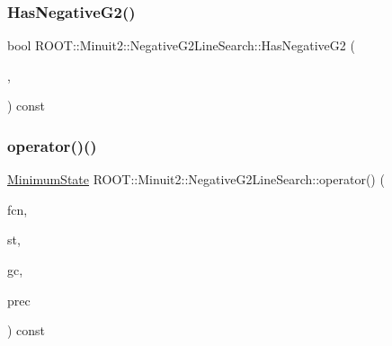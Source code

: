\mbox{\label{classROOT_1_1Minuit2_1_1NegativeG2LineSearch_a5450b0e5a0144e9c3e6028e8ae4a2c76}} 
\subsubsection{\texorpdfstring{HasNegativeG2()}{HasNegativeG2()}\hspace{0.1cm}{\footnotesize\ttfamily [3/3]}}
{\footnotesize\ttfamily bool R\+O\+O\+T\+::\+Minuit2\+::\+Negative\+G2\+Line\+Search\+::\+Has\+Negative\+G2 (\begin{DoxyParamCaption}\item[{const \mbox{\hyperlink{classROOT_1_1Minuit2_1_1FunctionGradient}{Function\+Gradient}} \&}]{,  }\item[{const \mbox{\hyperlink{classROOT_1_1Minuit2_1_1MnMachinePrecision}{Mn\+Machine\+Precision}} \&}]{ }\end{DoxyParamCaption}) const}

\mbox{\label{classROOT_1_1Minuit2_1_1NegativeG2LineSearch_ac39ff4c0d14335bd8c8bdcede066ecdf}} 
\subsubsection{\texorpdfstring{operator()()}{operator()()}\hspace{0.1cm}{\footnotesize\ttfamily [1/3]}}
{\footnotesize\ttfamily \mbox{\hyperlink{classROOT_1_1Minuit2_1_1MinimumState}{Minimum\+State}} R\+O\+O\+T\+::\+Minuit2\+::\+Negative\+G2\+Line\+Search\+::operator() (\begin{DoxyParamCaption}\item[{const \mbox{\hyperlink{classROOT_1_1Minuit2_1_1MnFcn}{Mn\+Fcn}} \&}]{fcn,  }\item[{const \mbox{\hyperlink{classROOT_1_1Minuit2_1_1MinimumState}{Minimum\+State}} \&}]{st,  }\item[{const \mbox{\hyperlink{classROOT_1_1Minuit2_1_1GradientCalculator}{Gradient\+Calculator}} \&}]{gc,  }\item[{const \mbox{\hyperlink{classROOT_1_1Minuit2_1_1MnMachinePrecision}{Mn\+Machine\+Precision}} \&}]{prec }\end{DoxyParamCaption}) const}

